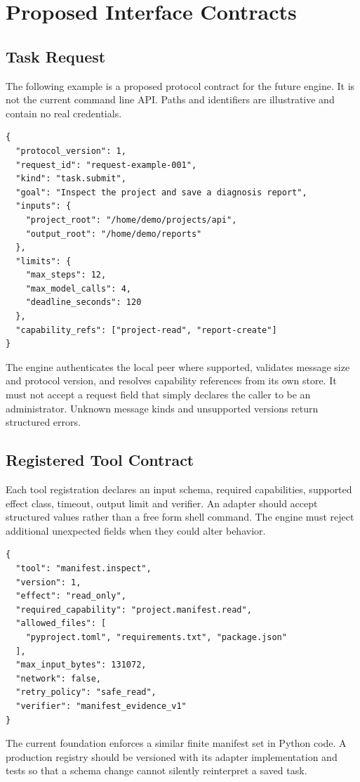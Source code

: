 \chapter{Proposed Interface Contracts}
\section{Task Request}
The following example is a proposed protocol contract for the future engine. It is not the current command line API. Paths and identifiers are illustrative and contain no real credentials.
\begin{lstlisting}[caption={Illustrative versioned task request}]
{
  "protocol_version": 1,
  "request_id": "request-example-001",
  "kind": "task.submit",
  "goal": "Inspect the project and save a diagnosis report",
  "inputs": {
    "project_root": "/home/demo/projects/api",
    "output_root": "/home/demo/reports"
  },
  "limits": {
    "max_steps": 12,
    "max_model_calls": 4,
    "deadline_seconds": 120
  },
  "capability_refs": ["project-read", "report-create"]
}
\end{lstlisting}

The engine authenticates the local peer where supported, validates message size and protocol version, and resolves capability references from its own store. It must not accept a request field that simply declares the caller to be an administrator. Unknown message kinds and unsupported versions return structured errors.

\section{Registered Tool Contract}
Each tool registration declares an input schema, required capabilities, supported effect class, timeout, output limit and verifier. An adapter should accept structured values rather than a free form shell command. The engine must reject additional unexpected fields when they could alter behavior.
\begin{lstlisting}[caption={Illustrative adapter registration}]
{
  "tool": "manifest.inspect",
  "version": 1,
  "effect": "read_only",
  "required_capability": "project.manifest.read",
  "allowed_files": [
    "pyproject.toml", "requirements.txt", "package.json"
  ],
  "max_input_bytes": 131072,
  "network": false,
  "retry_policy": "safe_read",
  "verifier": "manifest_evidence_v1"
}
\end{lstlisting}

The current foundation enforces a similar finite manifest set in Python code. A production registry should be versioned with its adapter implementation and tests so that a schema change cannot silently reinterpret a saved task.

